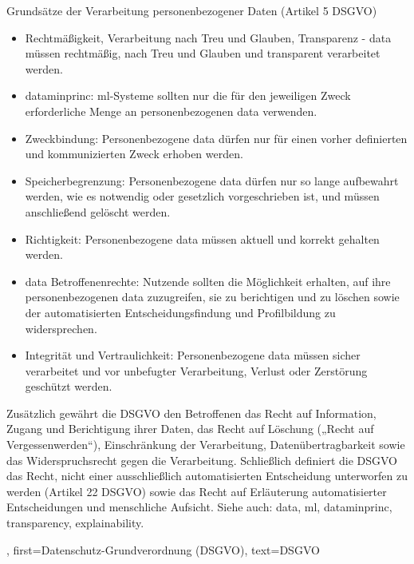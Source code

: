 {{{{			Grundsätze der Verarbeitung personenbezogener Daten (Artikel 5 DSGVO)
			\begin{itemize}
				\item{Rechtmäßigkeit, Verarbeitung nach Treu und Glauben, Transparenz} - \gls{data} müssen rechtmäßig, nach Treu und Glauben und transparent verarbeitet werden.
				\item \Gls{dataminprinc}: \gls{ml}-Systeme sollten nur die für den jeweiligen Zweck erforderliche Menge an personenbezogenen 
				\gls{data} verwenden.
				\item{Zweckbindung}: Personenbezogene \gls{data} dürfen nur für einen vorher definierten und kommunizierten Zweck erhoben werden. 
				\item{Speicherbegrenzung}: Personenbezogene \gls{data} dürfen nur so lange aufbewahrt werden, wie es notwendig oder gesetzlich vorgeschrieben ist, und müssen anschließend gelöscht werden. 
				\item{Richtigkeit}: Personenbezogene \gls{data} müssen aktuell und korrekt gehalten werden.
				\item \Gls{data} Betroffenenrechte: Nutzende sollten die Möglichkeit erhalten, auf ihre personenbezogenen \gls{data} zuzugreifen, sie zu berichtigen und zu löschen sowie der automatisierten Entscheidungsfindung und Profilbildung zu widersprechen.
				\item{Integrität und Vertraulichkeit}: Personenbezogene \gls{data} müssen sicher verarbeitet und vor unbefugter Verarbeitung, Verlust oder Zerstörung geschützt werden. 
			\end{itemize}
			
		Zusätzlich gewährt die DSGVO den Betroffenen das Recht auf Information, Zugang und Berichtigung ihrer Daten, das Recht auf Löschung („Recht auf Vergessenwerden“), Einschränkung
		 der Verarbeitung, Datenübertragbarkeit sowie das Widerspruchsrecht gegen die Verarbeitung. Schließlich definiert die DSGVO das Recht, nicht einer ausschließlich automatisierten
		  Entscheidung unterworfen zu werden (Artikel 22 DSGVO) sowie das Recht auf Erläuterung automatisierter Entscheidungen und menschliche Aufsicht. 
		Siehe auch: \gls{data}, \gls{ml}, \gls{dataminprinc}, \gls{transparency}, \gls{explainability}.}, 
	first={Datenschutz-Grundverordnung (DSGVO)},
	text={DSGVO}
}

}}
